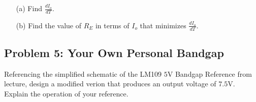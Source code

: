 \documentclass[11pt,twoside]{article}
\begin{document}
\begin{enumerate}
	\item[(a)] Find $\frac{dI_o}{dT}$.
	\item[(b)] Find the value of $R_E$ in terms of $I_o$ that minimizes $\frac{dI_o}{dT}$.

\end{enumerate}

\subsection*{Problem 5: Your Own Personal Bandgap}
Referencing the simplified schematic of the LM109 $5$V Bandgap Reference from lecture, design a modified verion that produces an output voltage of $7.5$V.\\
\vspace{2ex}
Explain the operation of your reference.
\end{document}
